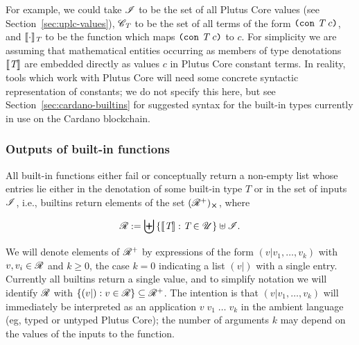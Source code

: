 
\noindent For example, we could take $\mathscr{I}$ to be the set of all Plutus Core
values (see Section~\ref{sec:uplc-values}), $\mathscr{C}_{\textit{T}}$ to be the set of all
terms of the form $\texttt{(} \texttt{con} ~ \textit{T} ~ c \texttt{)}$, and $\llbracket\mathit{\cdot}\rrbracket_{\textit{T}}$ to be the function
which maps $\texttt{(} \texttt{con} ~ \textit{T} ~ c \texttt{)}$ to $c$.  For simplicity we are assuming that
mathematical entities occurring as members of type denotations $\llbracket\mathit{\textit{T}}\rrbracket$
are embedded directly as values $c$ in Plutus Core constant terms. In reality,
tools which work with Plutus Core will need some concrete syntactic
representation of constants; we do not specify this here, but see
Section~\ref{sec:cardano-builtins}
for suggested syntax for the built-in types currently in use on the Cardano
blockchain.

\subsubsection{Outputs of built-in functions}
\label{sec:builtin-outputs}
All built-in functions either fail or conceptually return a non-empty list whose
entries lie either in the denotation of some built-in type $T$ or in the set of
inputs $\mathscr{I}$, i.e., builtins return elements of the set ${(\R^+)_{\errorX}}$,
where

$$
\mathscr{R} := \biguplus\left\{\llbracket\mathit{\textit{T}}\rrbracket: \textit{T} \in \mathscr{U} \right\} \uplus \mathscr{I}.
$$%

\noindent We will denote elements of $\mathscr{R}^+$ by expressions of the form $(v|v_1,
\ldots, v_k)$ with $v, v_i \in \mathscr{R}$ and $k \geq 0$, the case $k=0$ indicating a
list $(v|)$ with a single entry.  Currently all builtins return a single
value, and to simplify notation we will identify $\mathscr{R}$ with $\{(v|): v \in \mathscr{R}\}
\subseteq \mathscr{R}^+$.  The intention is that $(v|v_1, \ldots, v_k)$ will
immediately be interpreted as an application $v \;v_1\; \ldots\; v_k$ in the
ambient language (eg, typed or untyped Plutus Core); the number of arguments $k$
may depend on the values of the inputs to the function.

